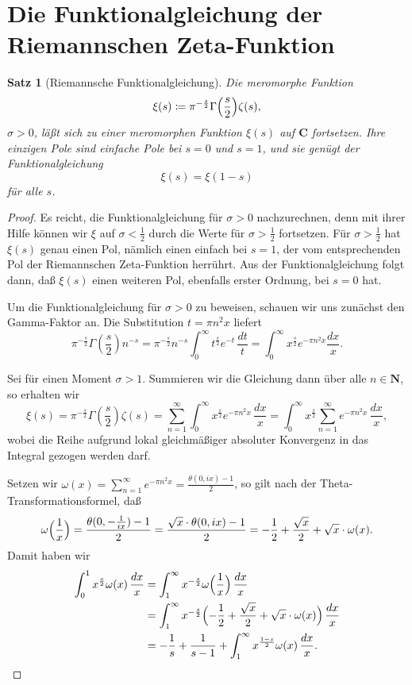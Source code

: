 \documentclass[a4paper,twoside,openright]{report}
\newtheorem{thm}{Satz}[chapter]
\theoremstyle{definition}
\theoremstyle{remark}
\begin{document}
\section{Die Funktionalgleichung der Riemannschen Zeta-Funktion}

\begin{thm}[Riemannsche Funktionalgleichung]
  Die meromorphe Funktion
  \[
    \xi(s) \coloneqq \pi^{- \frac s 2} \Gamma\Bigl(\frac s 2\Bigr) \zeta(s), 
  \]
  $\sigma > 0$, läßt sich zu einer meromorphen Funktion $\xi(s)$ auf $\mathbf C$
  fortsetzen. Ihre einzigen Pole sind einfache Pole bei $s = 0$ und $s = 1$, und sie genügt
  der Funktionalgleichung
  \[
    \xi(s) = \xi(1 - s)
  \]
  für alle $s$. 
\end{thm}

\begin{proof}
  Es reicht, die Funktionalgleichung für $\sigma > 0$ nachzurechnen, denn mit ihrer Hilfe können
  wir $\xi$ auf $\sigma < \frac 1 2$ durch die Werte für $\sigma > \frac 1 2$
  fortsetzen. Für $\sigma > \frac 1 2$ hat $\xi(s)$ genau einen Pol, nämlich
  einen einfach bei $s = 1$, der vom entsprechenden Pol der Riemannschen Zeta-Funktion
  herrührt. Aus der Funktionalgleichung folgt dann, daß $\xi(s)$ einen weiteren
  Pol, ebenfalls erster Ordnung, bei $s = 0$ hat.
  
  Um die Funktionalgleichung für $\sigma > 0$ zu beweisen, schauen wir uns
  zunächst den Gamma-Faktor an. Die Substitution $t = \pi n^2 x$ liefert
  \[
    \pi^{- \frac s 2} \Gamma\left(\frac s 2\right) n^{-s} = \pi^{- \frac s 2} n^{-s} \int_0^\infty t^{\frac s 2} e^{-t} \, \frac{dt} t
    = \int_0^\infty x^{\frac s 2} e^{-\pi n^2 x} \frac {dx} x.
  \]
  
  Sei für einen Moment $\sigma > 1$. Summieren wir die Gleichung dann über alle
  $n \in \mathbf N$, so erhalten wir
  \[
    \xi(s) = \pi^{-\frac s 2} \Gamma\left(\frac s 2\right) \zeta(s) = \sum_{n = 1}^\infty
    \int_0^\infty x^{\frac s 2} e^{-\pi n^2 x} \, \frac {dx} x
    = \int_0^\infty x^{\frac s 2} \sum_{n = 1}^\infty e^{-\pi n^2 x} \, \frac{dx} x,
  \]
  wobei die Reihe aufgrund lokal gleichmäßiger absoluter Konvergenz in das Integral gezogen
  werden darf.
  
  Setzen wir $\omega(x) = \sum_{n = 1}^\infty e^{-\pi n^2 x}
  = \frac{\theta(0, ix) - 1} 2$, so gilt nach der Theta-Transfor\-mationsformel,
  daß
  \[
    \omega\Bigl(\frac 1 x\Bigr) = \frac{\theta(0, - \frac 1 {ix}) - 1} 2
    = \frac{\sqrt x \cdot \theta(0, i x) - 1} 2
    = - \frac 1 2 + \frac{\sqrt x} 2 + \sqrt x \cdot \omega(x).
  \]
  Damit haben wir
  \[
    \begin{split}
      \int_0^1 x^{\frac s 2} \omega(x) \, \frac{dx} x
      & = \int_1^\infty x^{-\frac s 2} \omega\Bigl(\frac 1 x\Bigr) \, \frac{dx} x
      \\
      & = \int_1^\infty x^{-\frac s 2} \Bigl(-\frac 1 2 + \frac{\sqrt{x}} 2 + \sqrt x \cdot \omega(x)\Bigr) \, \frac{dx}{x}
      \\
      & = -\frac 1 s + \frac 1 {s - 1} + \int_1^\infty x^{\frac{1 - s} 2} \omega(x) \, \frac{dx} x.
    \end{split}
  \]
  

\end{proof}
\end{document}
